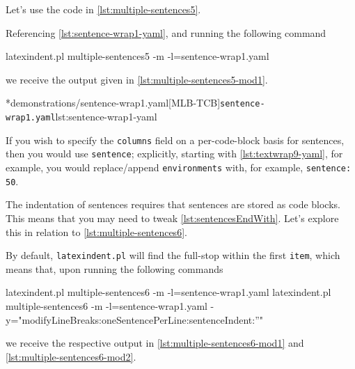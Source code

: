 	Let's use the code in \cref{lst:multiple-sentences5}.


	Referencing \cref{lst:sentence-wrap1-yaml}, and running the following command
	\begin{commandshell}
latexindent.pl multiple-sentences5 -m -l=sentence-wrap1.yaml
\end{commandshell}
	we receive the output given in \cref{lst:multiple-sentences5-mod1}.

	\begin{widepage}
		\begin{minipage}{.55\linewidth}
		\end{minipage}%
		\hfill
		\begin{minipage}{.45\linewidth}
			\cmhlistingsfromfile[style=yaml-LST]*{demonstrations/sentence-wrap1.yaml}[MLB-TCB]{\texttt{sentence-wrap1.yaml}}{lst:sentence-wrap1-yaml}
		\end{minipage}
	\end{widepage}

	If you wish to specify the \texttt{columns} field on a per-code-block basis
	for sentences, then you would use \texttt{sentence}; explicitly, starting with
	\vref{lst:textwrap9-yaml}, for example, you  would replace/append
	\texttt{environments} with, for example, \texttt{sentence: 50}.

	The indentation of sentences requires that sentences are stored as code blocks. This
	means that you may need to tweak \vref{lst:sentencesEndWith}. Let's explore this in
	relation to \cref{lst:multiple-sentences6}.


	By default, \texttt{latexindent.pl} will find the full-stop within the first
	\texttt{item}, which means that, upon running the following commands
	\begin{commandshell}
latexindent.pl multiple-sentences6 -m -l=sentence-wrap1.yaml 
latexindent.pl multiple-sentences6 -m -l=sentence-wrap1.yaml -y="modifyLineBreaks:oneSentencePerLine:sentenceIndent:''"
\end{commandshell}
	we receive the respective output in \cref{lst:multiple-sentences6-mod1} and
	\cref{lst:multiple-sentences6-mod2}.

